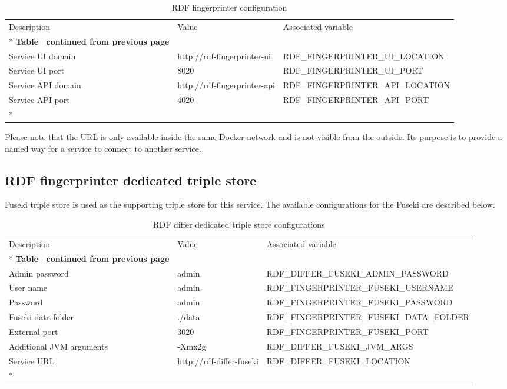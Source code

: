 	\begin{longtable}[c]{@{}p{3.8cm}p{3cm}l@{}}
		\toprule
		Description & Value & Associated variable \\* \midrule
		\endfirsthead
		\multicolumn{3}{c}%
		{{\bfseries Table \thetable\ continued from previous page}} \\
		\endhead
		\bottomrule
		\endfoot
		\endlastfoot
		Service UI domain & http://rdf-fingerprinter-ui & RDF\_FINGERPRINTER\_UI\_LOCATION \\
		Service UI port & 8020 & RDF\_FINGERPRINTER\_UI\_PORT \\
		Service API domain & http://rdf-fingerprinter-api & RDF\_FINGERPRINTER\_API\_LOCATION \\
		Service API port & 4020 & RDF\_FINGERPRINTER\_API\_PORT \\* \bottomrule
		\caption{RDF fingerprinter configuration}
		\label{tab:my-table7}\\
	\end{longtable}

	Please note that the URL is only available inside the same Docker network and is not visible from the outside. Its purpose is to provide a named way for a service to connect to another service.
	
	\subsection{RDF fingerprinter dedicated triple store}
	
	Fuseki triple store is used as the supporting triple store for this service.
	The available configurations for the Fuseki are described below. 
	
	
	\begin{longtable}[c]{@{}p{4cm}p{2.5cm}l@{}}
		\toprule
		Description & Value & Associated variable \\* \midrule
		\endfirsthead
		\multicolumn{3}{c}%
		{{\bfseries Table \thetable\ continued from previous page}} \\
		\endhead
		\bottomrule
		\endfoot
		\endlastfoot
		Admin password & admin & \footnotesize RDF\_DIFFER\_FUSEKI\_ADMIN\_PASSWORD \\
		User name & admin & \footnotesize RDF\_FINGERPRINTER\_FUSEKI\_USERNAME \\
		Password & admin & \footnotesize RDF\_FINGERPRINTER\_FUSEKI\_PASSWORD \\
		Fuseki data folder & ./data & \footnotesize RDF\_FINGERPRINTER\_FUSEKI\_DATA\_FOLDER \\
		External port & 3020 & \footnotesize RDF\_FINGERPRINTER\_FUSEKI\_PORT \\
		Additional JVM arguments & -Xmx2g & \footnotesize RDF\_DIFFER\_FUSEKI\_JVM\_ARGS \\
		Service URL & http://rdf-differ-fuseki & \footnotesize RDF\_DIFFER\_FUSEKI\_LOCATION \\* \bottomrule
		\caption{RDF differ dedicated triple store configurations}
		\label{tab:my-table8}\\
	\end{longtable}

